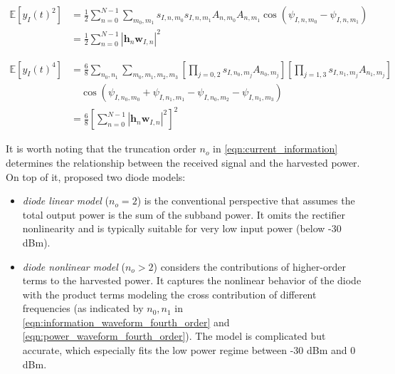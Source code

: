 \begin{align}\label{eqn:information_waveform_second_order}
  \mathbb{E}\left[ {{y_I}{{(t)}^2}} \right] &= \frac{1}{2}\sum\limits_{n = 0}^{N - 1} {\sum\limits_{{m_0},{m_1}} {{s_{I,n,{m_0}}}} } {s_{I,n,{m_1}}}{A_{n,{m_0}}}{A_{n,{m_1}}}\cos \left( {{\psi _{I,n,{m_0}}} - {\psi _{I,n,{m_1}}}} \right) \\
   &= \frac{1}{2}\sum\limits_{n = 0}^{N - 1} {{{\left| {{{\mathbf{h}}_n}{{\mathbf{w}}_{I,n}}} \right|}^2}}
\end{align}

\begin{align}\label{eqn:information_waveform_fourth_order}
  \mathbb{E}\left[ {{y_I}{{(t)}^4}} \right] &= \frac{6}{8}\sum\limits_{{n_0},{n_1}} {\sum\limits_{{m_0},{m_1},{m_2},{m_3}} {\left[ {\prod\limits_{j = 0,2} {{s_{I,{n_0},{m_j}}}{A_{{n_0},{m_j}}}} } \right]\left[ {\prod\limits_{j = 1,3} {{s_{I,{n_1},{m_j}}}{A_{{n_1},{m_j}}}} } \right]} } \nonumber \\
   &\quad \cos \left( {{\psi _{I,{n_0},{m_0}}} + {\psi _{I,{n_1},{m_1}}} - {\psi _{I,{n_0},{m_2}}} - {\psi _{I,{n_1},{m_3}}}} \right) \\
   &= \frac{6}{8}{\left[ {\sum\limits_{n = 0}^{N - 1} {{{\left| {{{\mathbf{h}}_n}{{\mathbf{w}}_{I,n}}} \right|}^2}} } \right]^2} \label{eqn:waveform_end}
\end{align}

It is worth noting that the truncation order ${n_o}$ in \eqref{eqn:current_information} determines the relationship between the received signal and the harvested power. On top of it, \cite{Clerckx2016} proposed two diode models:

\begin{itemize}
  \item \textit{diode linear model} (${n_o} = 2$) is the conventional perspective that assumes the total output power is the sum of the subband power. It omits the rectifier nonlinearity and is typically suitable for very low input power (below -30 dBm).
  \item \textit{diode nonlinear model} (${n_o} > 2$) considers the contributions of higher-order terms to the harvested power. It captures the nonlinear behavior of the diode with the product terms
      modeling the cross contribution of different frequencies (as indicated by ${{n_0},{n_1}}$ in \eqref{eqn:information_waveform_fourth_order} and \eqref{eqn:power_waveform_fourth_order}). The model is complicated but accurate, which especially fits the low power regime between -30 dBm and 0 dBm.
\end{itemize}

